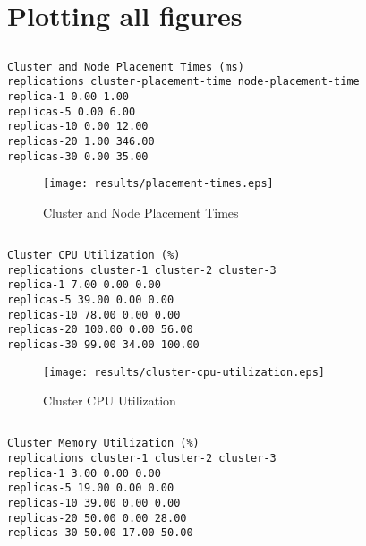 \documentclass{elsart}
\begin{document}
\section{Plotting all figures}
\subsection{}

\begin{lstlisting}[caption={Cluster and Node Placement Times}]
Cluster and Node Placement Times (ms)
replications cluster-placement-time node-placement-time
replica-1 0.00 1.00
replicas-5 0.00 6.00
replicas-10 0.00 12.00
replicas-20 1.00 346.00
replicas-30 0.00 35.00
\end{lstlisting}

\begin{figure}[ht]
\centering
\texttt{[image: results/placement-times.eps]}
\caption{Cluster and Node Placement Times}\label{fig:placement-times.eps}
\end{figure}

\subsection{}

\begin{lstlisting}[caption={Cluster CPU Utilization}]
Cluster CPU Utilization (%)
replications cluster-1 cluster-2 cluster-3
replica-1 7.00 0.00 0.00
replicas-5 39.00 0.00 0.00
replicas-10 78.00 0.00 0.00
replicas-20 100.00 0.00 56.00
replicas-30 99.00 34.00 100.00
\end{lstlisting}

\begin{figure}[ht]
\centering
\texttt{[image: results/cluster-cpu-utilization.eps]}
\caption{Cluster CPU Utilization}\label{fig:cluster-cpu-utilization.eps}
\end{figure}

\subsection{}

\begin{lstlisting}[caption={Cluster Memory Utilization}]
Cluster Memory Utilization (%)
replications cluster-1 cluster-2 cluster-3
replica-1 3.00 0.00 0.00
replicas-5 19.00 0.00 0.00
replicas-10 39.00 0.00 0.00
replicas-20 50.00 0.00 28.00
replicas-30 50.00 17.00 50.00
\end{lstlisting}
\end{document}
